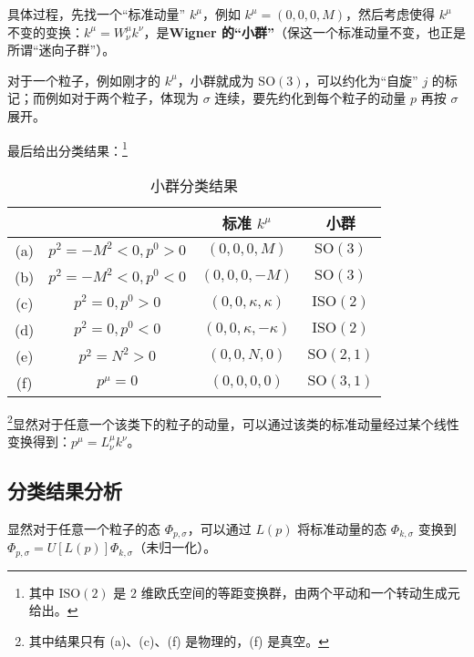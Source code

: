 具体过程，先找一个“标准动量” $k^\mu$，例如 $k^\mu = (0, 0, 0, M)$，然后考虑使得 $k^\mu$ 不变的变换：$k^\mu = W^\mu_\nu k^\nu$，是\textbf{\textbf{Wigner 的“小群”}}（保这一个标准动量不变，也正是所谓“迷向子群”）。

对于一个粒子，例如刚才的 $k^\mu$，小群就成为 $\text{SO}(3)$，可以约化为“自旋” $j$ 的标记；而例如对于两个粒子，体现为 $\sigma$ 连续，要先约化到每个粒子的动量 $p$ 再按 $\sigma$ 展开。

最后给出分类结果：\footnote{其中 $\text{ISO}(2)$ 是 $2$ 维欧氏空间的等距变换群，由两个平动和一个转动生成元给出。}
\begin{table}[ht]
\centering
\caption{小群分类结果}\label{tab_WigCla1}
\begin{tabular}{|c|c|c|c|}
\hline
     &  & 标准 $k^\mu$ & 小群 \\
    \hline
    (a) & $p^2 = -M^2 < 0, p^0 > 0$ & $(0, 0, 0, M)$ & $\text{SO}(3)$ \\
    \hline
    (b) & $p^2 = -M^2 < 0, p^0 < 0$ & $(0, 0, 0, -M)$ & $\text{SO}(3)$ \\
    \hline
    (c) & $p^2 = 0, p^0>0$ & $(0, 0, \kappa, \kappa)$ & $\text{ISO}(2)$ \\
    \hline
    (d) & $p^2 = 0, p^0<0$ & $(0, 0, \kappa, -\kappa)$ & $\text{ISO}(2)$ \\ 
    \hline
    (e) & $p^2 = N^2 > 0$ & $(0, 0, N, 0)$ & $\text{SO}(2, 1)$ \\
    \hline
    (f) & $p^\mu = 0$ & $(0, 0, 0, 0)$ & $\text{SO}(3, 1)$ \\
    \hline
\end{tabular}
\end{table}

\footnote{其中结果只有 (a)、(c)、(f) 是物理的，(f) 是真空。}显然对于任意一个该类下的粒子的动量，可以通过该类的标准动量经过某个线性变换得到：$p^\mu = L^\mu_\nu k^\nu$。

\subsection{分类结果分析}
显然对于任意一个粒子的态 $\Phi_{p, \sigma}$，可以通过 $L(p)$ 将标准动量的态 $\Phi_{k, \sigma}$ 变换到 $\Phi_{p, \sigma} = U[L(p)] \Phi_{k,\sigma}$（未归一化）。

